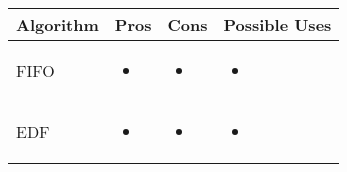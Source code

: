\documentclass[./report.tex]{subfiles}
\begin{document}
\begin{tabular}{|m{8em}|m{12em}|m{12em}|m{12em}|} 
	\hline 
	\textbf{Algorithm} & \textbf{Pros} & \textbf{Cons} & \textbf{Possible Uses} \\ 
	\hline
	FIFO 
	&  
	\begin{itemize}[leftmargin=*]
		\item 
	\end{itemize}
	&  
	\begin{itemize}[leftmargin=*]
		\item 
	\end{itemize}
	& 
	\begin{itemize}[leftmargin=*]
		\item 
	\end{itemize}
	\\
	\hline
	EDF 
	&  
	\begin{itemize}[leftmargin=*]
		\item 
	\end{itemize}
	&  
	\begin{itemize}[leftmargin=*]
		\item 
	\end{itemize}
	& 
	\begin{itemize}[leftmargin=*]
		\item 
	\end{itemize}
	\\
	\hline
\end{tabular}
\end{document}
